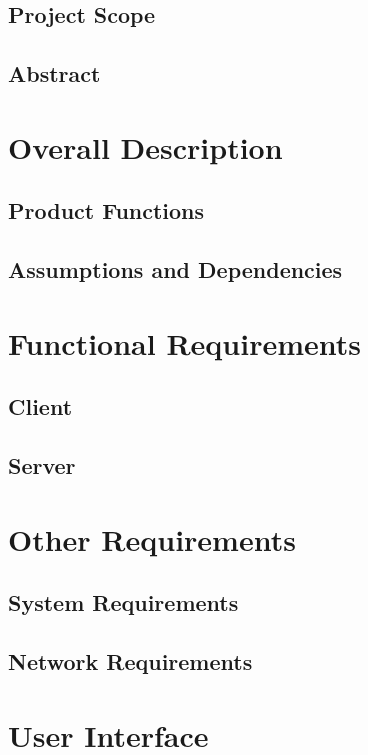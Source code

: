 \documentclass{scrreprt}
\begin{document}
\section{Project Scope}

\section{Abstract}

\chapter{Overall Description}

\section{Product Functions}

\section{Assumptions and Dependencies}

\chapter{Functional  Requirements}

\section{Client }

\section{Server}

\chapter{Other Requirements}

\section{System Requirements}

\section{Network Requirements}

\chapter{User Interface}
\end{document}
